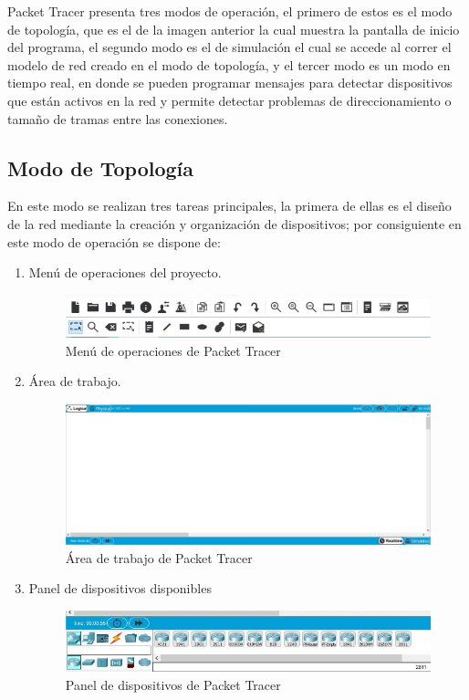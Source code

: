 \documentclass[journal]{IEEEtran}
\begin{document}
Packet Tracer presenta tres modos de operación, el primero de estos es el modo de topología, que es el de la imagen anterior la cual muestra la pantalla de inicio del programa, el segundo modo es el de simulación el cual se accede al correr el modelo de red creado en el modo de topología, y el tercer modo es un modo en tiempo real, en donde se pueden programar mensajes para detectar dispositivos que están activos en la red y permite detectar problemas de direccionamiento o tamaño de tramas entre las conexiones.

\subsection{Modo de Topología}
En este modo se realizan tres tareas principales, la primera de ellas es el diseño de la red mediante la creación y organización de dispositivos; por consiguiente en este modo de operación se dispone de:
\begin{enumerate}
	\item Menú de operaciones del proyecto.
		\begin{figure}[ht]
			\centering
			\includegraphics[scale=0.4]{pt_menuoperaciones.jpg}
			\caption{Menú de operaciones de Packet Tracer}
		\end{figure}
	\item Área de trabajo.
		\begin{figure}[ht]
			\centering
			\includegraphics[scale=0.19]{pt_areatrabajo.jpg}
			\caption{Área de trabajo de Packet Tracer}
		\end{figure}
	\item Panel de dispositivos disponibles
		\begin{figure}[ht]
			\centering
			\includegraphics[scale=0.44]{pt_paneldispositivos.jpg}
			\caption{Panel de dispositivos de Packet Tracer}
		\end{figure}
\end{enumerate}
\end{document}
